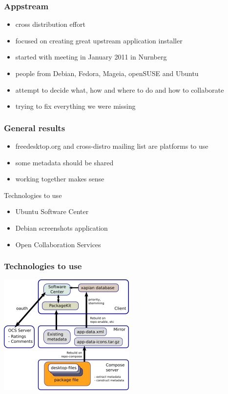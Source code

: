 \documentclass{beamer}
\begin{document}

\begin{frame}[t]
\frametitle{Appstream}
\begin{itemize}
\item cross distribution effort
\item focused on creating great upstream application installer
\item started with meeting in January 2011 in Nurnberg
\item people from Debian, Fedora, Mageia, openSUSE and Ubuntu
\item attempt to decide what, how and where to do and how to collaborate
\item trying to fix everything we were missing
\end{itemize}
\end{frame}


\begin{frame}[t]
\frametitle{General results}
\begin{itemize}
\item freedesktop.org and cross-distro mailing list are platforms to use
\item some metadata should be shared
\item working together makes sense
\end{itemize}

\vspace{1cm}

{\Large Technologies to use}
\begin{itemize}
\item Ubuntu Software Center
\item Debian screenshots application
\item Open Collaboration Services
\end{itemize}
\end{frame}

\begin{frame}[t]
\frametitle{Technologies to use}
\begin{center}
\includegraphics[height=6cm]{architecture}
\end{center}
\end{frame}
\end{document}
